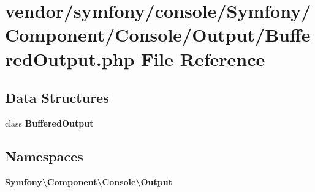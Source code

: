 \section{vendor/symfony/console/\+Symfony/\+Component/\+Console/\+Output/\+Buffered\+Output.php File Reference}
\label{_buffered_output_8php}
\subsection*{Data Structures}
\begin{DoxyCompactItemize}
\item 
class {\bf Buffered\+Output}
\end{DoxyCompactItemize}
\subsection*{Namespaces}
\begin{DoxyCompactItemize}
\item 
 {\bf Symfony\textbackslash{}\+Component\textbackslash{}\+Console\textbackslash{}\+Output}
\end{DoxyCompactItemize}
